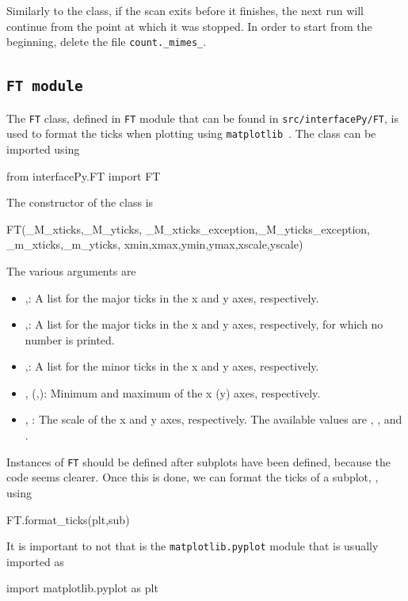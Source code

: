\documentclass[11pt,a4paper]{article}
\begin{document}
Similarly to the  class, if the scan exits before it finishes, the next run will continue from the point at which it was stopped.
In order to start from the beginning, delete the file {\tt count.\_mimes\_}.



\subsection{\tt FT module}
%
The {\tt FT} class, defined in {\tt FT} module that can be found in {\tt src/interfacePy/FT}, is used to format the ticks when plotting using {\tt matplotlib}~\cite{Hunter:2007}. 
%
The class can be imported using
%
\begin{py}
	from interfacePy.FT import FT 
\end{py} 
%
The constructor of the class is
%
\begin{py}
	FT(_M_xticks,_M_yticks, _M_xticks_exception,_M_yticks_exception, _m_xticks,_m_yticks,
			xmin,xmax,ymin,ymax,xscale,yscale)
\end{py}
%
The various arguments are
%
\begin{itemize}
	\item {},: A list for  the major ticks in the x and y axes, respectively.
	\item {},: A list for  the major ticks in the x and y axes, respectively, for which no number is printed.
	\item {},: A list for  the minor ticks in the x and y axes, respectively.
	\item {},  (,): Minimum and maximum of the x (y) axes, respectively. 
	\item {}, : The scale of the x and y axes, respectively. The available values are , , and . 
\end{itemize}


Instances of {\tt FT} should be defined after subplots have been defined, because the code seems clearer. Once this is done, we can format the ticks of a subplot, , using  
%
\begin{py}
	FT.format_ticks(plt,sub)
\end{py}
%
It is important to not that  is the {\tt matplotlib.pyplot} module that is usually imported as
%
\begin{py}
	import matplotlib.pyplot as plt
\end{py}
\end{document}
